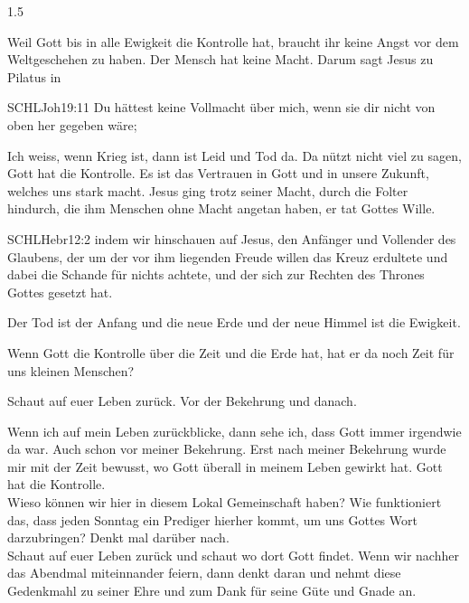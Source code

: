 \documentclass[fontsize=14pt]{../../inc/mybib}
\begin{document}
\begin{spacing}{1.5}
\begin{block}
        Weil Gott bis in alle Ewigkeit die Kontrolle hat, braucht ihr keine Angst vor dem Weltgeschehen zu haben. Der Mensch hat keine Macht. Darum sagt Jesus zu Pilatus in
        \begin{bibelbox}{SCHL}{Joh}{19:11}
            Du hättest keine Vollmacht über mich, wenn sie dir nicht von oben her gegeben wäre;
        \end{bibelbox}
        Ich weiss, wenn Krieg ist, dann ist Leid und Tod da. Da nützt nicht viel zu sagen, Gott hat die Kontrolle. Es ist das Vertrauen in Gott und in unsere Zukunft, welches uns stark macht. Jesus ging trotz seiner Macht, durch die Folter hindurch, die ihm Menschen ohne Macht angetan haben, er tat Gottes Wille. 
        \begin{bibelbox}{SCHL}{Hebr}{12:2}
        indem wir hinschauen auf Jesus, den Anfänger und Vollender des Glaubens, der um der vor ihm liegenden Freude willen das Kreuz erdultete und dabei die Schande für nichts achtete, und der sich zur Rechten des Thrones Gottes gesetzt hat.
        \end{bibelbox}
        Der Tod ist der Anfang und die neue Erde und der neue Himmel ist die Ewigkeit.  
        
        Wenn Gott die Kontrolle über die Zeit und die Erde hat, hat er da noch Zeit für uns kleinen Menschen?

        Schaut auf euer Leben zurück. Vor der Bekehrung und danach.
        
        Wenn ich auf mein Leben zurückblicke, dann sehe ich, dass Gott immer irgendwie da war. Auch schon vor meiner Bekehrung. Erst nach meiner Bekehrung wurde mir mit der Zeit bewusst, wo Gott überall in meinem Leben gewirkt hat. Gott hat die Kontrolle. 
        \\ Wieso können wir hier in diesem Lokal Gemeinschaft haben? Wie funktioniert das, dass jeden Sonntag ein Prediger hierher kommt, um uns Gottes Wort darzubringen? Denkt mal darüber nach.
        \\ Schaut auf euer Leben zurück und schaut wo  dort Gott findet. Wenn wir nachher das Abendmal miteinnander feiern, dann denkt daran und nehmt diese Gedenkmahl zu seiner Ehre und zum Dank für seine Güte und Gnade an.


\end{block}
\end{spacing}
\end{document}
